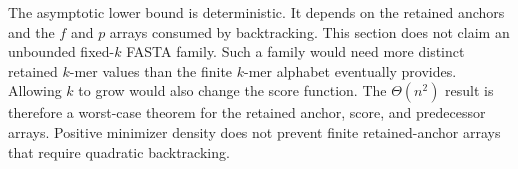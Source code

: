 The asymptotic lower bound is deterministic. It depends on the retained
anchors and the \(f\) and \(p\) arrays consumed by backtracking. This section
does not claim an unbounded fixed-\(k\) FASTA family. Such a family would need
more distinct retained \(k\)-mer values than the finite \(k\)-mer alphabet eventually
provides. Allowing \(k\) to grow would also change the score function. The
\(\Theta(n^2)\) result is therefore a worst-case theorem for the retained
anchor, score, and predecessor arrays. Positive minimizer density does not
prevent finite retained-anchor arrays that require quadratic backtracking.

